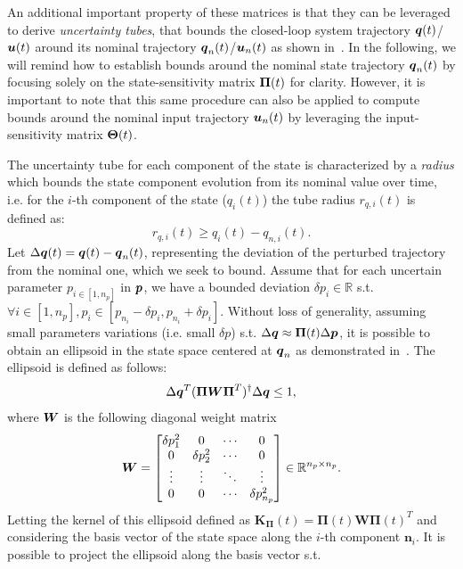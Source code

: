 An additional important property of these matrices is that they can be leveraged to derive \emph{uncertainty tubes}, that bounds the closed-loop system trajectory $\boldsymbol{q}(t)$/$\boldsymbol{u}(t)$ around its nominal trajectory $\boldsymbol{q}_n(t)$/$\boldsymbol{u}_n(t)$ as shown in~\cite{cTube}.
In the following, we will remind how to establish bounds around the nominal state trajectory $\boldsymbol{q}_n(t)$ by focusing solely on the state-sensitivity matrix $\boldsymbol{\Pi}(t)$ for clarity. 
However, it is important to note that this same procedure can also be applied to compute bounds around the nominal input trajectory $\boldsymbol{u}_n(t)$ by leveraging the input-sensitivity matrix $\boldsymbol{\Theta}(t)$.

The uncertainty tube for each component of the state is characterized by a \emph{radius} which bounds the state component evolution from its nominal value over time, i.e. for the $i$-th component of the state ($q_i(t)$) the tube radius $r_{q,i}(t)$ is defined as:
\begin{equation}\label{eq:bounds_q}
   r_{q,i}(t) \geq q_i(t) - q_{n,i}(t).
\end{equation}
Let $\Delta\boldsymbol{q}(t) = \boldsymbol{q}(t) - \boldsymbol{q}_n(t)$, representing the deviation of the perturbed trajectory from the nominal one, which we seek to bound.
Assume that for each uncertain parameter $p_{i \in [1, n_p]}$ in $\boldsymbol{p}$, we have a bounded deviation $\delta p_i \in \mathbb{R}$ s.t. $\forall i \in [1, n_p] ,p_i \in [p_{n_i}-\delta p_i, p_{n_i}+\delta p_i]$.
Without loss of generality, assuming small parameters variations (i.e. small $\delta p$) s.t. $\Delta\boldsymbol{q} \approx \boldsymbol{\Pi}(t) \Delta\boldsymbol{p}$, it is possible to obtain an ellipsoid in the state space centered at $\boldsymbol{q}_n$ as demonstrated in~\cite{cTube}.
The ellipsoid is defined as follows:
\begin{equation}\label{eq:ellipsoid}
  \Delta\boldsymbol{q}^T (\boldsymbol{\Pi} \boldsymbol{W} \boldsymbol{\Pi}^T)^\dag \Delta\boldsymbol{q} \leq 1,
\end{equation}
where $\boldsymbol{W}$ is the following diagonal weight matrix
\begin{equation*}
  \boldsymbol{W} = \begin{bmatrix}
    \delta p_1^2 & 0 & \cdots & 0 \\
    0 & \delta p_2^2 & \cdots & 0 \\
    \vdots & \vdots & \ddots & \vdots \\
    0 & 0 & \cdots & \delta p_{n_p}^2
    \end{bmatrix} \in \mathbb{R}^{n_p \times n_p}.
\end{equation*}
Letting the kernel of this ellipsoid defined as $\boldsymbol{K_{\Pi}}(t) = \boldsymbol{\Pi}(t)\boldsymbol{W}\boldsymbol{\Pi}(t)^T$ and considering the basis vector of the state space along the $i$-th component $\boldsymbol{n}_i$. 
It is possible to project the ellipsoid along the basis vector s.t.


